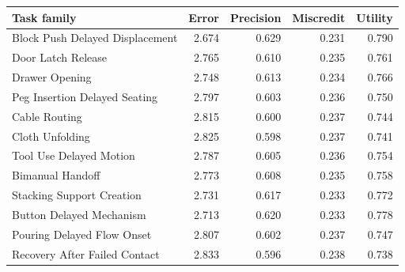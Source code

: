 \begin{tabular}{lrrrr}
\toprule
Task family & Error & Precision & Miscredit & Utility \\
\midrule
Block Push Delayed Displacement & 2.674 & 0.629 & 0.231 & 0.790 \\
Door Latch Release & 2.765 & 0.610 & 0.235 & 0.761 \\
Drawer Opening & 2.748 & 0.613 & 0.234 & 0.766 \\
Peg Insertion Delayed Seating & 2.797 & 0.603 & 0.236 & 0.750 \\
Cable Routing & 2.815 & 0.600 & 0.237 & 0.744 \\
Cloth Unfolding & 2.825 & 0.598 & 0.237 & 0.741 \\
Tool Use Delayed Motion & 2.787 & 0.605 & 0.236 & 0.754 \\
Bimanual Handoff & 2.773 & 0.608 & 0.235 & 0.758 \\
Stacking Support Creation & 2.731 & 0.617 & 0.233 & 0.772 \\
Button Delayed Mechanism & 2.713 & 0.620 & 0.233 & 0.778 \\
Pouring Delayed Flow Onset & 2.807 & 0.602 & 0.237 & 0.747 \\
Recovery After Failed Contact & 2.833 & 0.596 & 0.238 & 0.738 \\
\bottomrule
\end{tabular}
